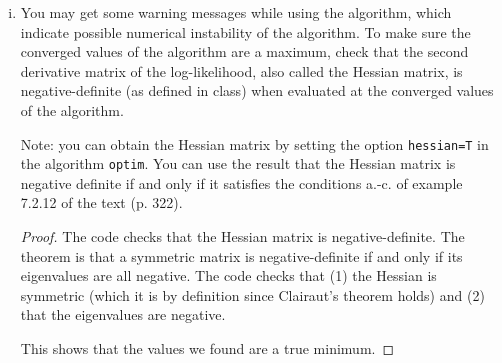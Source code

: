 \documentclass[letterpaper, 12pt]{article}
\newcommand{\pr}{\text{pr}}
\newcommand{\sbs}{\;|\;} %
\begin{document}
\begin{enumerate}
\begin{enumerate}[(i)]
\begin{proof}
The likelihood function from part (ii) of the last homework is 
\begin{align}
\pr(Y_i \sbs I_i = 1, \theta) = \prod_{i=1}^{500} \frac{f(y_i, \theta) y_i}{E_\theta[Y_i]}
\end{align}
Since maximizing the likelihood gives the same results as maximizing the log of the likelihood, we maximize
\begin{equation}
\log(\pr(Y_i \sbs I_i = 1, \theta)) = \sum_{i=1}^{500} \log(f(Y_i, \theta)) + \log( Y_i) - \log(E_\theta[Y_i])
\end{equation}
varying the parameters $\theta_1$ and $\theta_2$ using \texttt{optim}. Note that $f(Y_i, \theta)$ is the density of a gamma distribution with mean $\theta_1$ and variance $\theta_2$.

The optimal values are $\hat{\theta_1}=$ and $\hat{\theta_2}=$. %
\end{proof}

\item
You may get some warning messages while using the
algorithm, which indicate possible numerical instability of the algorithm.
To make sure the converged values of the algorithm are a maximum, check that
the second derivative matrix of the log-likelihood, also called the Hessian
matrix, is negative-definite (as defined in class) when evaluated at the
converged values of the algorithm. 

Note: you can obtain the Hessian matrix
by setting the option \texttt{hessian=T} in the
algorithm \texttt{optim}. You can use the result
that the Hessian matrix is negative definite if and only if it satisfies the
conditions a.-c. of example 7.2.12 of the text (p. 322).

\begin{proof}
The code checks that the Hessian matrix is negative-definite. The theorem is that a symmetric matrix is negative-definite if and only if its eigenvalues are all negative. The code checks that (1) the Hessian is symmetric (which it is by definition since Clairaut's theorem holds) and (2) that the eigenvalues are negative.


This shows that the values we found are a true minimum.
\end{proof}


\end{enumerate}
\end{enumerate}
\end{document}
